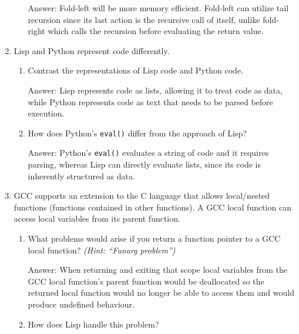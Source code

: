 \documentclass[12pt,letterpaper]{ntdhw}
\begin{document}
\begin{enumerate}
\begin{enumerate}
    \begin{emph}
      Answer: Fold-left will be more memory efficient. Fold-left can utilize tail recursion since its last action is the recursive call of itself, unlike fold-right which calls the recursion before evaluating the return value.
    \end{emph}
  \end{enumerate}

  \item Lisp and Python represent code differently.

  \begin{enumerate}
    \item Contrast the representations of Lisp code and Python code.

    \begin{emph}
      Answer: Lisp represents code as lists, allowing it to treat code as data, while Python represents code as text that needs to be parsed before execution.
    \end{emph}

    \item How does Python's {\tt eval()} differ from the approach of Lisp?

    \begin{emph}
      Answer:  Python’s {\tt eval()} evaluates a string of code and it requires parsing, whereas Lisp can directly evaluate lists, since its code is inherently structured as data.
    \end{emph}
  \end{enumerate}

  \item GCC supports an extension to the C language that allows
  local/nested functions (functions contained in other functions).  A
  GCC local function can access local variables from its parent
  function.
  \begin{enumerate}
    \item What problems would arise if you return a function pointer
    to a GCC local function? \emph{(Hint: ``Funarg problem'')}

    \begin{emph}
      Answer: When returning and exiting that scope local variables from the GCC local function's parent function would be deallocated so the returned local function would no longer be able to access them and would produce undefined behaviour.
    \end{emph}

    \item How does Lisp handle this problem?


\end{enumerate}
\end{enumerate}
\end{document}
